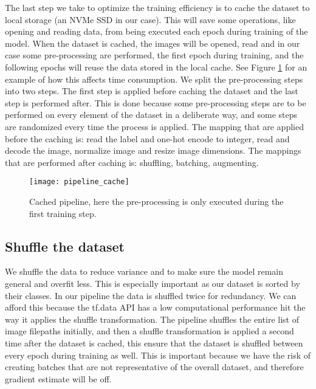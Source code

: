\documentclass[thesis.tex]{subfiles}
\begin{document}
The last step we take to optimize the training efficiency is to cache the dataset to local storage (an NVMe SSD in our case). This will save some operations, like opening and reading data, from being executed each epoch during training of the model. 
When the dataset is cached, the images will be opened, read and in our case some pre-processing are performed, the first epoch during training, and the following epochs will reuse the data stored in the local cache. See Figure \ref{fig:pipeline_cache} for an example of how this affects time consumption.
We split the pre-processing steps into two steps. The first step is applied before caching the dataset and the last step is performed after. This is done because some pre-processing steps are to be performed on every element of the dataset in a deliberate way, and some steps are randomized every time the process is applied.
The mapping that are applied before the caching is: read the label and one-hot encode to integer, read and decode the image, normalize image and resize image dimensions. The mappings that are performed after caching is: shuffling, batching, augmenting.

\begin{figure} %
  \begin{center}
    \texttt{[image: pipeline\_cache]}
    \caption[Pipeline with cache.]{Cached pipeline, here the pre-processing is only executed during the first training step.}
    \label{fig:pipeline_cache}
  \end{center}
\end{figure}



\subsection{Shuffle the dataset}
We shuffle the data to reduce variance and to make sure the model remain general and overfit less. This is especially important as our dataset is sorted by their classes.
In our pipeline the data is shuffled twice for redundancy. We can afford this because the tf.data API has a low computational performance hit the way it applies the shuffle transformation. 
The pipeline shuffles the entire list of image filepaths initially, and then a shuffle transformation is applied a second time after the dataset is cached, this ensure that the dataset is shuffled between every epoch during training as well. This is important because we have the risk of creating batches that are not representative of the overall dataset, and therefore gradient estimate will be off.
\end{document}
